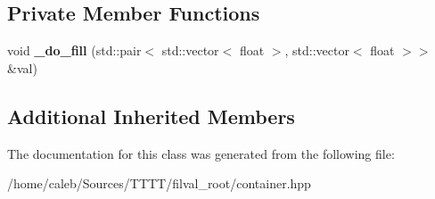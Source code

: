 \subsection*{Private Member Functions}
\begin{DoxyCompactItemize}
\item 
\hypertarget{classfv_1_1root_1_1ContainerTH2FMany_a17efa27a901c971bfda82cf218d63264}{}\label{classfv_1_1root_1_1ContainerTH2FMany_a17efa27a901c971bfda82cf218d63264} 
void {\bfseries \+\_\+do\+\_\+fill} (std\+::pair$<$ std\+::vector$<$ float $>$, std\+::vector$<$ float $>$$>$ \&val)
\end{DoxyCompactItemize}
\subsection*{Additional Inherited Members}


The documentation for this class was generated from the following file\+:\begin{DoxyCompactItemize}
\item 
/home/caleb/\+Sources/\+T\+T\+T\+T/filval\+\_\+root/container.\+hpp\end{DoxyCompactItemize}
